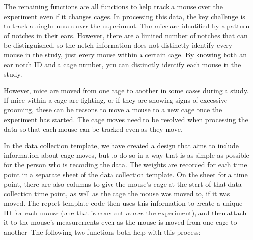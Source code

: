 \documentclass[
]{book}
\begin{document}
The remaining functions are all functions to help track a mouse over the
experiment even if it changes cages. In processing this data, the key challenge
is to track a single mouse over the experiment. The mice are identified by a
pattern of notches in their ears. However, there are a limited number of notches
that can be distinguished, so the notch information does not distinctly identify
every mouse in the study, just every mouse within a certain cage. By knowing
both an ear notch ID and a cage number, you can distinctly identify each mouse
in the study.

However, mice are moved from one cage to another in some cases during a study.
If mice within a cage are fighting, or if they are showing signs of
excessive grooming, these can be reasons to move a mouse to a new cage once
the experiment has started. The cage moves need to be resolved when
processing the data so that each mouse can be tracked even as they move.

In the data collection template, we have created a design that aims to include
information about cage moves, but to do so in a way that is as simple as
possible for the person who is recording the data. The weights are recorded for
each time point in a separate sheet of the data collection template. On the
sheet for a time point, there are also columns to give the mouse's cage at the
start of that data collection time point, as well as the cage the mouse was
moved to, if it was moved. The report template code then uses this information
to create a unique ID for each mouse (one that is constant across the
experiment), and then attach it to the mouse's measurements even as the mouse is
moved from one cage to another. The following two functions both help with
this process:
\end{document}
